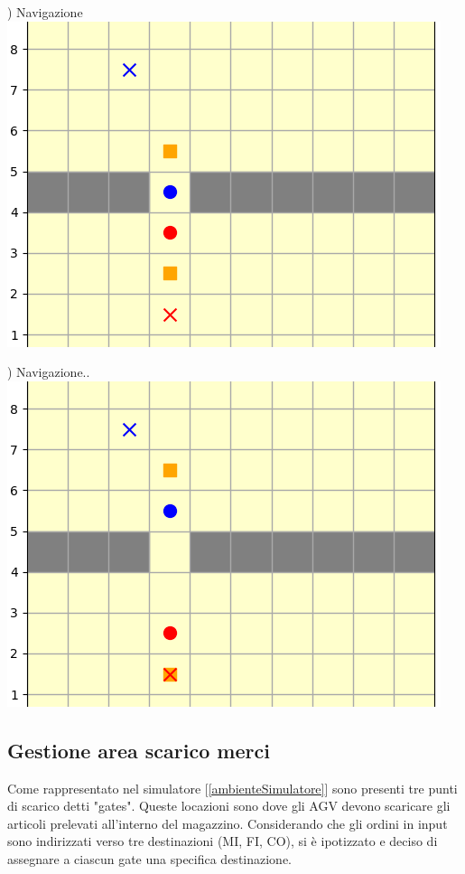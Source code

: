 \documentclass[12pt]{article}
\begin{document}
\noindent\begin{minipage}[ht]{0.45\linewidth}
) Navigazione
\includegraphics[width=\textwidth]{SimulazioniNavigazione/2AGV_ConflittoWait/4t.png}
\end{minipage}
\begin{minipage}[ht]{0.45\linewidth}
) Navigazione..
\includegraphics[width=\textwidth]{SimulazioniNavigazione/2AGV_ConflittoWait/5t.png}
\end{minipage}

\newpage

\subsection{Gestione area scarico merci}
Come rappresentato nel simulatore [\ref{ambienteSimulatore}] sono presenti tre punti di scarico detti "gates". Queste locazioni sono dove gli AGV devono scaricare gli articoli prelevati all'interno del magazzino. Considerando che gli ordini in input sono indirizzati verso tre destinazioni (MI, FI, CO), si è ipotizzato e deciso di assegnare a ciascun gate una specifica destinazione. 
\end{document}
